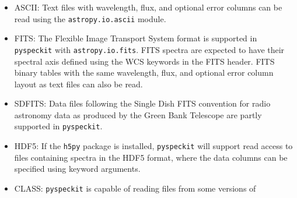 \documentclass[twocolumn,linenumbers]{aastex63}
\newcommand{\pyspeckit}{\texttt{pyspeckit}\xspace}
\begin{document}
\begin{itemize}
    \item ASCII: Text files with wavelength, flux, and optional error
        columns can be read using the \texttt{astropy.io.ascii} module.
    \item FITS: The Flexible Image Transport System \citep[FITS;][]{Wells1981a,Greisen2006a,Pence2010a} format is
	supported in \pyspeckit with \texttt{astropy.io.fits}.  
    FITS spectra are expected to have their spectral axis defined using the WCS
    keywords in the FITS header.  FITS binary tables with the same
    wavelength, flux, and optional error column layout as text files
    can also be read.
    \item SDFITS: Data files following the Single
	Dish FITS \citep[SDFITS;][]{Garwood2000a} convention for radio astronomy data as
	produced by the Green Bank Telescope are partly supported in \pyspeckit.
    \item HDF5: 
        If the \texttt{h5py} package is installed, \pyspeckit will support read
        access to files containing spectra in the HDF5 format, where the data
        columns can be specified using keyword arguments.
    \item CLASS: \pyspeckit is capable of reading files from some versions of

\end{itemize}
\end{document}
